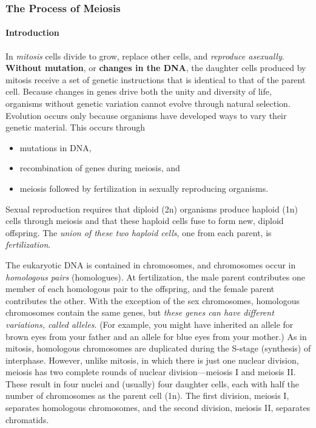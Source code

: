 \documentclass[12pt]{article}
\begin{document}
\subsubsection{The Process of Meiosis}
\paragraph{Introduction}
In \emph{mitosis} cells divide to grow, replace other cells, and \emph{reproduce asexually}. \textbf{Without mutation}, or \textbf{changes in the DNA}, the daughter cells produced by mitosis receive a set of genetic instructions that is identical to that of the parent cell. Because changes in genes drive both the unity and diversity of life, organisms without genetic variation cannot evolve through natural selection. Evolution occurs only because organisms have developed ways to vary their genetic material. This occurs through 
\begin{itemize}
    \item mutations in DNA, 
    \item recombination of genes during meiosis, and 
    \item meiosis followed by fertilization in sexually reproducing organisms.
\end{itemize}
Sexual reproduction requires that diploid (2n) organisms produce haploid (1n) cells through meiosis and that these haploid cells fuse to form new, diploid offspring. The \emph{union of these two haploid cells}, one from each parent, is \emph{fertilization}.

The eukaryotic DNA is contained in chromosomes, and chromosomes occur in \emph{homologous pairs} (homologues). At fertilization, the male parent contributes one member of each homologous pair to the offspring, and the female parent contributes the other. With the exception of the sex chromosomes, homologous chromosomes contain the same genes, but \emph{these genes can have different variations, called alleles}. (For example, you might have inherited an allele for brown eyes from your father and an allele for blue eyes from your mother.) As in mitosis, homologous chromosomes are duplicated during the S-stage (synthesis) of interphase. However, unlike mitosis, in which there is just one nuclear division, meiosis has two complete rounds of nuclear division—meiosis I and meiosis II. These result in four nuclei and (usually) four daughter cells, each with half the number of chromosomes as the parent cell (1n). The first division, meiosis I, separates homologous chromosomes, and the second division, meiosis II, separates chromatids. 
\end{document}
